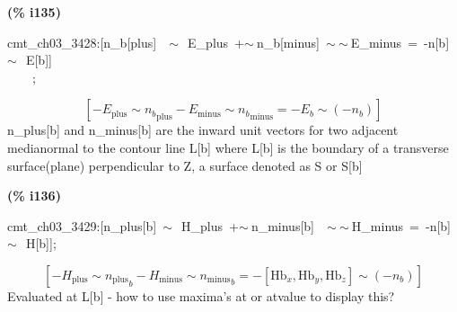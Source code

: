 \documentclass[fleqn]{article}
\begin{document}
\noindent
\begin{minipage}[t]{4.000000em}\color{red}\bfseries
(\% i135)	
\end{minipage}
\begin{minipage}[t]{\textwidth}\color{blue}
cmt\_ch03\_3428:[n\_b[plus]\ \ \ensuremath{\sim\ }\ E\_plus\ +\ensuremath{\sim\ }n\_b[minus]\ \ensuremath{\sim\ }\ensuremath{\sim\ }E\_minus\ =\ -n[b]\ \ensuremath{\sim\ }\ E[b]]\\
\ \ \ \ ;
\end{minipage}
\[\displaystyle \tag{cmt\_ ch03\_ 3428} 
\left[ -{E_{\ensuremath{\mathrm{plus}}}}\operatorname{\sim  }{{{n_b}}_{\ensuremath{\mathrm{plus}}}}-{E_{\ensuremath{\mathrm{minus}}}}\operatorname{\sim  }{{{n_b}}_{\ensuremath{\mathrm{minus}}}}=-{E_b}\operatorname{\sim  }\left( -{n_b}\right) \right] \mbox{}
\]
n\_plus[b] and n\_minus[b] are the inward unit vectors for two adjacent medianormal to the contour line L[b] where L[b] is the boundary of a transverse surface(plane) perpendicular to Z, a surface denoted as S or S[b]


\noindent
\begin{minipage}[t]{4.000000em}\color{red}\bfseries
(\% i136)	
\end{minipage}
\begin{minipage}[t]{\textwidth}\color{blue}
cmt\_ch03\_3429:[n\_plus[b]\ \ensuremath{\sim\ }\ H\_plus\ +\ensuremath{\sim\ }n\_minus[b]\ \ \ensuremath{\sim\ }\ensuremath{\sim\ }H\_minus\ =\ -n[b]\ \ensuremath{\sim\ }\ H[b]];
\end{minipage}
\[\displaystyle \tag{cmt\_ ch03\_ 3429} 
\left[ -{H_{\ensuremath{\mathrm{plus}}}}\operatorname{\sim  }{{{n_{\ensuremath{\mathrm{plus}}}}}_b}-{H_{\ensuremath{\mathrm{minus}}}}\operatorname{\sim  }{{{n_{\ensuremath{\mathrm{minus}}}}}_b}=-\left[ {{\ensuremath{\mathrm{Hb}}}_x}\operatorname{,}{{\ensuremath{\mathrm{Hb}}}_y}\operatorname{,}{{\ensuremath{\mathrm{Hb}}}_z}\right] \operatorname{\sim  }\left( -{n_b}\right) \right] \mbox{}
\]
Evaluated at L[b] - how to use maxima's at or atvalue to display this?
\end{document}
